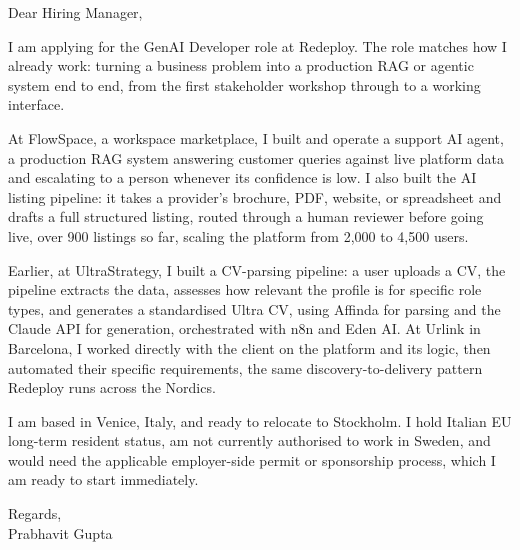 \documentclass[a4paper,11pt]{article}
\begin{document}
Dear Hiring Manager,

I am applying for the GenAI Developer role at Redeploy. The role matches how I already work: turning a business problem into a production RAG or agentic system end to end, from the first stakeholder workshop through to a working interface.

At FlowSpace, a workspace marketplace, I built and operate a support AI agent, a production RAG system answering customer queries against live platform data and escalating to a person whenever its confidence is low. I also built the AI listing pipeline: it takes a provider's brochure, PDF, website, or spreadsheet and drafts a full structured listing, routed through a human reviewer before going live, over 900 listings so far, scaling the platform from 2,000 to 4,500 users.

Earlier, at UltraStrategy, I built a CV-parsing pipeline: a user uploads a CV, the pipeline extracts the data, assesses how relevant the profile is for specific role types, and generates a standardised Ultra CV, using Affinda for parsing and the Claude API for generation, orchestrated with n8n and Eden AI. At Urlink in Barcelona, I worked directly with the client on the platform and its logic, then automated their specific requirements, the same discovery-to-delivery pattern Redeploy runs across the Nordics.

I am based in Venice, Italy, and ready to relocate to Stockholm. I hold Italian EU long-term resident status, am not currently authorised to work in Sweden, and would need the applicable employer-side permit or sponsorship process, which I am ready to start immediately.

Regards,\\
Prabhavit Gupta
\end{document}
